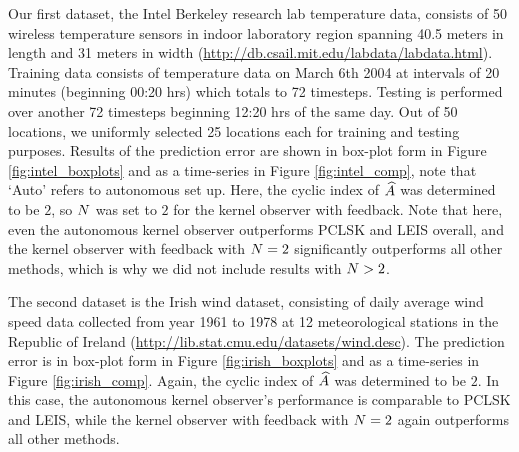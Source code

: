 Our first dataset, the Intel Berkeley research lab temperature data, consists of 50 wireless temperature sensors in indoor laboratory region spanning 40.5 meters in length and 31 meters in width ({\url{http://db.csail.mit.edu/labdata/labdata.html}}). Training data consists of temperature data on March 6th 2004 at intervals of 20 minutes (beginning 00:20 hrs) which totals to 72 timesteps. Testing is performed over another 72 timesteps beginning 12:20 hrs of the same day. Out of 50 locations, we uniformly selected 25 locations each for training and testing purposes. Results of the prediction error are shown in box-plot form in Figure \ref{fig:intel_boxplots} and as a time-series in Figure \ref{fig:intel_comp}, note that `Auto' refers to autonomous set up. Here, the cyclic index of $\widehat{A}$ was determined to be $2$, so $N$ was set to $2$ for the kernel observer with feedback. Note that here, even the autonomous kernel observer outperforms PCLSK and LEIS overall, and the kernel observer with feedback with $N = 2$ significantly outperforms all other methods, which is why we did not include results with $N > 2$. 
%
%




The second dataset is the Irish wind dataset, consisting of daily average
wind speed %
data collected from year
1961 to 1978 at 12 meteorological stations in the Republic
of Ireland ({\url{http://lib.stat.cmu.edu/datasets/wind.desc}}). The prediction error  is in box-plot form in Figure \ref{fig:irish_boxplots} and as a time-series in Figure \ref{fig:irish_comp}. Again, the cyclic index of $\widehat{A}$ was determined to be $2$. In this case, the autonomous kernel observer's performance is comparable to PCLSK and LEIS, while the kernel observer with feedback with $N = 2$ again outperforms all other methods. 

